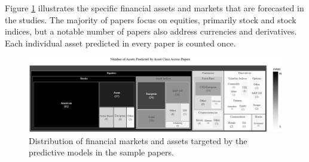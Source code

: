Figure \ref{fig:treemap_asset_by_market} illustrates the specific financial assets and markets that are forecasted in the studies. The majority of papers focus on equities, primarily stock and stock indices, but a notable number of papers also address currencies and derivatives. Each individual asset predicted in every paper is counted once.   
\begin{figure}[h]
    \centering
    \includegraphics[width=1\linewidth]{Images/treemap_asset_by_market.png}
    \caption[Distribution of financial markets and assets forecasted in the sample]{Distribution of financial markets and assets targeted by the predictive models in the sample papers. }
    \label{fig:treemap_asset_by_market}
\end{figure}




